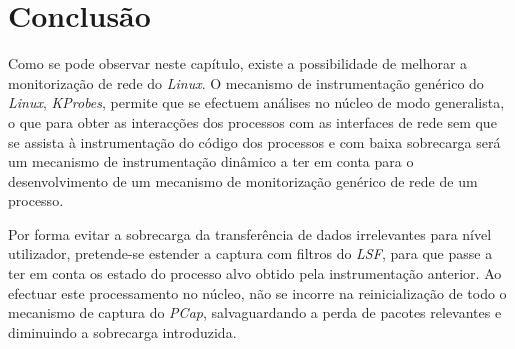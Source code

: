 


\section{Conclusão}
\label{sec:segundo:conclusion}
Como se pode observar neste capítulo, existe a possibilidade de melhorar a monitorização de rede do \textit{Linux}.
O mecanismo de instrumentação genérico do \textit{Linux}, \textit{KProbes}, permite que se efectuem análises no núcleo de modo generalista, o que para obter as interacções dos processos com as interfaces de rede sem que se assista à instrumentação do código dos processos e com baixa sobrecarga será um mecanismo de instrumentação dinâmico a ter em conta para o desenvolvimento de um mecanismo de monitorização genérico de rede de um processo.

Por forma evitar a sobrecarga da transferência de dados irrelevantes para nível utilizador, pretende-se estender a captura com filtros do \textit{LSF}, para que passe a ter em conta os estado do processo alvo obtido pela instrumentação anterior.
Ao efectuar este processamento no núcleo, não se incorre na reinicialização de todo o mecanismo de captura do \textit{PCap}, salvaguardando a perda de pacotes relevantes e diminuindo a sobrecarga introduzida.
